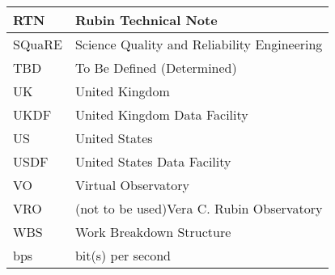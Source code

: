 \begin{longtable}{p{}p{}}
RTN & Rubin Technical Note \\\hline
SQuaRE & Science Quality and Reliability Engineering \\\hline
TBD & To Be Defined (Determined) \\\hline
UK & United Kingdom \\\hline
UKDF & United Kingdom Data Facility \\\hline
US & United States \\\hline
USDF & United States Data Facility \\\hline
VO & Virtual Observatory \\\hline
VRO & (not to be used)Vera C. Rubin Observatory \\\hline
WBS & Work Breakdown Structure \\\hline
bps & bit(s) per second \\\hline
\end{longtable}
